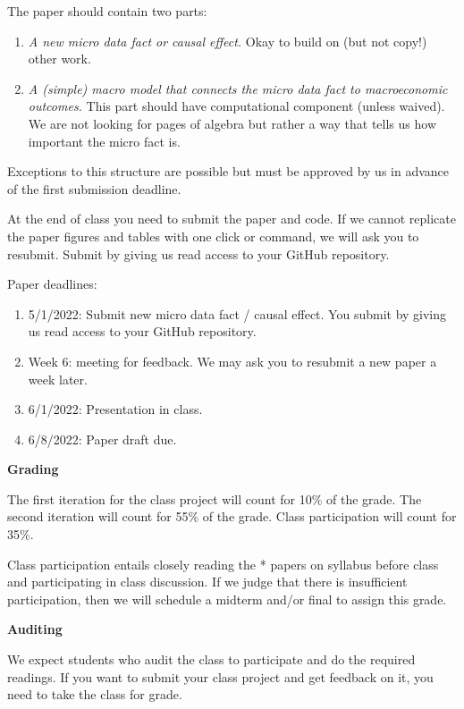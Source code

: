 \documentclass [12pt]{article}
\begin{document}
The paper should contain two parts:
\begin{enumerate}
	\item \emph{A new micro data fact or causal effect.} Okay to build on (but not copy!) other work.
	\item \emph{A (simple) macro model that connects the micro data fact to macroeconomic outcomes.}  This part should have computational component (unless waived). We are not looking for pages of algebra but rather a way that tells us how important the micro fact is.
\end{enumerate}
Exceptions to this structure are possible but must be approved by us in advance of the first submission deadline.

At the end of class you need to submit the paper and code. If we cannot replicate the paper figures and tables with one click or command, we will ask you to resubmit. Submit by giving us read access to your GitHub repository.

Paper deadlines:
\begin{enumerate}
	\item 5/1/2022: Submit new micro data fact / causal effect.  You submit by giving us read access to your GitHub repository.
	\item Week 6: meeting for feedback. We may ask you to resubmit a new paper a week later.
	\item 6/1/2022: Presentation in class.
	\item 6/8/2022: Paper draft due.
\end{enumerate}


\noindent  \textbf{Grading}

\noindent The first iteration for the class project will count for 10\% of the grade. The second iteration will count for 55\% of the grade. Class participation will count for 35\%.

Class participation entails closely reading the * papers on syllabus before class and participating in class discussion. If we judge that there is insufficient participation, then we will schedule a midterm and/or final to assign this grade.






\noindent  \textbf{Auditing}

\noindent We expect students who audit the class to participate and do the required readings. If you want to submit your class project and get feedback on it, you need to take the class for grade.
\end{document}
